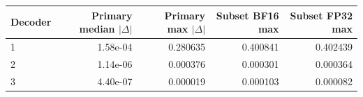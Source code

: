 \begin{tabular}{lrrrr}
\toprule
Decoder & Primary median $|\Delta|$ & Primary max $|\Delta|$ & Subset BF16 max & Subset FP32 max \\
\midrule
1 & 1.58e-04 & 0.280635 & 0.400841 & 0.402439 \\
2 & 1.14e-06 & 0.000376 & 0.000301 & 0.000364 \\
3 & 4.40e-07 & 0.000019 & 0.000103 & 0.000082 \\
\bottomrule
\end{tabular}
